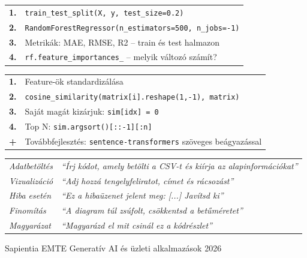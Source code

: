 \documentclass[11pt,a4paper]{article}
\begin{document}
\smallskip

\begin{tcolorbox}[cheatstyle, title={Random Forest -- lépések}]
\begin{tabularx}{\linewidth}{@{}lX@{}}
\textbf{1.} & \texttt{train\_test\_split(X, y, test\_size=0.2)} \\[2pt]
\textbf{2.} & \texttt{RandomForestRegressor(n\_estimators=500, n\_jobs=-1)} \\[2pt]
\textbf{3.} & Metrikák: MAE, RMSE, R2 -- train és test halmazon \\[2pt]
\textbf{4.} & \texttt{rf.feature\_importances\_} -- melyik változó számít? \\
\end{tabularx}
\end{tcolorbox}

\smallskip

\begin{tcolorbox}[cheatstyle, title={Cosine similarity ajánló (opcionális)}]
\begin{tabularx}{\linewidth}{@{}lX@{}}
\textbf{1.} & Feature-ök standardizálása \\[2pt]
\textbf{2.} & \texttt{cosine\_similarity(matrix[i].reshape(1,-1), matrix)} \\[2pt]
\textbf{3.} & Saját magát kizárjuk: \texttt{sim[idx] = 0} \\[2pt]
\textbf{4.} & Top N: \texttt{sim.argsort()[::-1][:n]} \\[2pt]
\textbf{+} & Továbbfejlesztés: \texttt{sentence-transformers} szöveges beágyazással \\
\end{tabularx}
\end{tcolorbox}

\smallskip

\begin{tcolorbox}[cheatstyle, title={Vibe coding -- hasznos promptminták}]
\begin{tabularx}{\linewidth}{@{}lX@{}}
\textit{Adatbetöltés} & \textit{``Írj kódot, amely betölti a CSV-t és kiírja az alapinformációkat''} \\[3pt]
\textit{Vizualizáció} & \textit{``Adj hozzá tengelyfeliratot, címet és rácsozást''} \\[3pt]
\textit{Hiba esetén} & \textit{``Ez a hibaüzenet jelent meg: [...] Javítsd ki''} \\[3pt]
\textit{Finomítás} & \textit{``A diagram túl zsúfolt, csökkentsd a betűméretet''} \\[3pt]
\textit{Magyarázat} & \textit{``Magyarázd el mit csinál ez a kódrészlet''} \\
\end{tabularx}
\end{tcolorbox}

\vfill
\begin{center}
\small\textcolor{medgray}{Sapientia EMTE \textbullet{} Generatív AI és üzleti alkalmazások \textbullet{} 2026}
\end{center}
\end{document}
